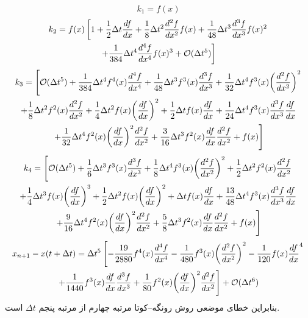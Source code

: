 \documentclass[12pt,a4paper]{article}
\begin{document}
	\begin{equation}
		k_1 = f(x)
	\end{equation}
	\begin{multline}
		k_2 = f(x)\left[1 + \frac{1}{2} \Delta t \dv{f}{x} + \frac{1}{8} \Delta t^2 \dv[2]{f}{x}f(x)
		+ \frac{1}{48} \Delta t^3 \dv[3]{f}{x} f(x)^2\right. \\
		\left. + \frac{1}{384} \Delta t^4 \dv[4]{f}{x} f(x)^3 + \mathcal{O}(\Delta t^5)\right]
	\end{multline}
	\begin{multline}
		k_3 = \left[\mathcal{O}(\Delta t^5) + \frac{1}{384} \Delta t^4 f^4(x) \dv[4]{f}{x}+\frac{1}{48} \Delta t^3 f^3(x) \dv[3]{f}{x}
		+\frac{1}{32} \Delta t^4 f^3(x) \qty(\dv[2]{f}{x})^2 \right. \\
		+\frac{1}{8} \Delta t^2 f^2(x) \dv[2]{f}{x}+\frac{1}{4} \Delta t^2 f(x) \qty(\dv{f}{x})^2+\frac{1}{2} \Delta t f(x) \dv{f}{x}
		+\frac{1}{24} \Delta t^4 f^3(x) \dv[3]{f}{x} \dv{f}{x} \\
		\left.+\frac{1}{32} \Delta t^4 f^2(x) \qty(\dv{f}{x})^2 \dv[2]{f}{x}
		+\frac{3}{16} \Delta t^3 f^2(x) \dv{f}{x} \dv[2]{f}{x}+f(x)\right]
	\end{multline}
	\begin{multline}
		k_4 = \left[\mathcal{O}(\Delta t^5) + \frac{1}{6} \Delta t^3 f^3(x) \dv[3]{f}{x}+\frac{1}{8} \Delta t^4 f^3(x) \qty(\dv[2]{f}{x})^2
		+\frac{1}{2} \Delta t^2 f^2(x) \dv[2]{f}{x} \right. \\
		+\frac{1}{4} \Delta t^3 f(x) \qty(\dv{f}{x})^3+\frac{1}{2} \Delta t^2 f(x) \qty(\dv{f}{x})^2 + \Delta t f(x) \dv{f}{x}
		+\frac{13}{48}\Delta t^4 f^3(x) \dv[3]{f}{x} \dv{f}{x} \\
		\left. +\frac{9}{16} \Delta t^4 f^2(x) \qty(\dv{f}{x})^2 \dv[2]{f}{x}
		+\frac{5}{8} \Delta t^3 f^2(x) \dv{f}{x} \dv[2]{f}{x}+f(x)\right]
	\end{multline}
	\begin{multline}
		x_{n+1} - x(t+\Delta{t}) = \Delta t^5\left[-\frac{19}{2880} f^4(x) \dv[4]{f}{x}(x)-\frac{1}{480} f^3(x) \qty(\dv[2]{f}{x})^2
		-\frac{1}{120} f(x) \dv{f}{x}^4 \right. \\
		\left.+\frac{1}{1440}f^3(x)\dv{f}{x}\dv[3]{f}{x}(x)+\frac{1}{80} f^2(x) \qty(\dv{f}{x})^2 \dv[2]{f}{x}\right] + \mathcal{O}(\Delta t^6)
	\end{multline}
	بنابراین خطای موضعی روش رونگه--کوتا مرتبه چهارم از مرتبه پنجم $\Delta t$ است.
\end{document}
